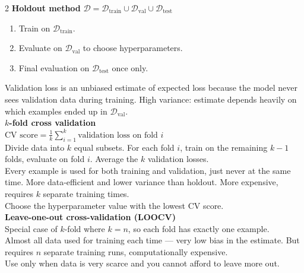 \documentclass[10pt]{article}
\begin{document}
\begin{multicols*}{2}
\textbf{Holdout method}
$\mathcal{D} = \mathcal{D}_{\text{train}} \cup \mathcal{D}_{\text{val}} \cup \mathcal{D}_{\text{test}}$\\
\begin{enumerate}
    \item Train on $\mathcal{D}_{\text{train}}$.
    \item Evaluate on $\mathcal{D}_{\text{val}}$ to choose hyperparameters.
    \item Final evaluation on $\mathcal{D}_{\text{test}}$ once only.
\end{enumerate}
Validation loss is an unbiased estimate of expected loss because the model never sees validation data during training.
High variance: estimate depends heavily on which examples ended up in $\mathcal{D}_{\text{val}}$.\\
\textbf{$k$-fold cross validation}\\
$\text{CV score} = \frac{1}{k} \sum_{i=1}^{k} \text{validation loss on fold } i$\\
Divide data into $k$ equal subsets. For each fold $i$, train on the remaining $k - 1$ folds, evaluate on fold $i$. Average the $k$ validation losses.\\
Every example is used for both training and validation, just never at the same time.
More data-efficient and lower variance than holdout.
More expensive, requires $k$ separate training times.\\
Choose the hyperparameter value with the lowest CV score.\\
\textbf{Leave-one-out cross-validation (LOOCV)}\\
Special case of $k$-fold where $k=n$, so each fold has exactly one example.\\
Almost all data used for training each time — very low bias in the estimate. But requires $n$ separate training runs, computationally expensive.\\
Use only when data is very scarce and you cannot afford to leave more out.\\






\end{multicols*}
\end{document}
